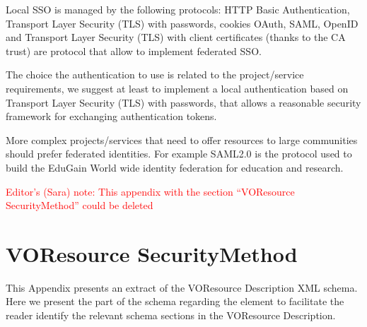 \documentclass[11pt,a4paper]{ivoa}
\begin{document}
Local SSO is managed by  the following protocols: HTTP Basic
Authentication,  Transport Layer Security (TLS) with passwords, cookies
OAuth, SAML, OpenID and Transport Layer Security (TLS) with client
certificates (thanks to the CA trust) are protocol that
allow to implement  federated SSO.

The choice the authentication  to use is related to the project/service
requirements, we suggest at least to implement
a local authentication based on Transport Layer Security (TLS) with
passwords, that allows a reasonable security
framework for exchanging authentication tokens.

More complex projects/services that need to offer resources to large
communities should prefer federated identities.
For example SAML2.0 is the protocol used to build the EduGain World wide
identity federation  for education and research.

\textcolor{red}{Editor's (Sara) note: This appendix with the section 
``VOResource  SecurityMethod'' could be deleted}

\appendix
\section{VOResource  SecurityMethod}
This Appendix presents an extract of the VOResource Description XML
schema. Here we present the part of the schema regarding the
 element
to facilitate the reader identify the relevant schema sections in the
VOResource Description.
\end{document}
